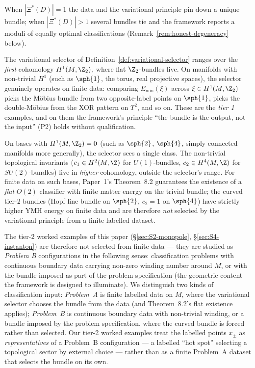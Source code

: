 When $|\Xi^*(D)|=1$ the data and the variational principle pin down a
unique bundle; when $|\Xi^*(D)|>1$ several bundles tie and the framework
reports a moduli of equally optimal classifications
(Remark~\ref{rem:honest-degeneracy} below).

\begin{remark}\label{rem:problem-A-B}
The variational selector of
Definition~\ref{def:variational-selector} ranges over the
\emph{first} cohomology $H^1(M,\Z_2)$, where flat $\Z_2$-bundles
live. On manifolds with non-trivial $H^1$ (such as $\sph{1}$,
the torus, real projective spaces), the selector genuinely operates
on finite data: comparing $E_{\min}(\xi)$ across $\xi\in H^1(M,\Z_2)$
picks the M\"obius bundle from two opposite-label points on
$\sph{1}$, picks the double-M\"obius from the XOR pattern on $T^2$,
and so on. These are the \emph{tier 1} examples, and on them the
framework's principle ``the bundle is the output, not the input''
(P2) holds without qualification.

On bases with $H^1(M,\Z_2)=0$ (such as $\sph{2}$, $\sph{4}$,
simply-connected manifolds more generally), the selector sees a
single class. The non-trivial topological invariants
($c_1\in H^2(M,\Z)$ for $U(1)$-bundles, $c_2\in H^4(M,\Z)$ for
$SU(2)$-bundles) live in \emph{higher} cohomology, outside the
selector's range. For finite data on such bases, Paper~1's
Theorem~8.2 \cite{Vasii2026Paper1} guarantees the existence of a
\emph{flat} $O(2)$ classifier with finite matter energy on the
trivial bundle; the curved tier-2 bundles (Hopf line bundle on
$\sph{2}$, $c_2=1$ on $\sph{4}$) have strictly higher YMH energy
on finite data and are therefore \emph{not} selected by the
variational principle from a finite labelled dataset.

The tier-2 worked examples of this paper
(\S\ref{sec:S2-monopole}, \S\ref{sec:S4-instanton}) are therefore
not selected from finite data --- they are studied as
\emph{Problem B} configurations in the following sense:
classification problems with
continuous boundary data carrying non-zero winding number around
$M$, or with the bundle imposed as part of the problem
specification (the geometric content the framework is designed to
illuminate). We distinguish two kinds of classification input:
\emph{Problem~A} is finite labelled
data on $M$, where the variational selector chooses the bundle from
the data (and Theorem~8.2's flat existence applies); \emph{Problem~B}
is continuous boundary data with non-trivial winding, or a bundle
imposed by the problem specification, where the curved bundle is
forced rather than selected. Our
tier-2 worked examples treat the labelled points $x_\pm$ as
\emph{representatives} of a Problem~B configuration --- a labelled
``hot spot'' selecting a topological sector by external choice ---
rather than as a finite Problem~A dataset that selects the bundle
on its own.


\end{remark}
